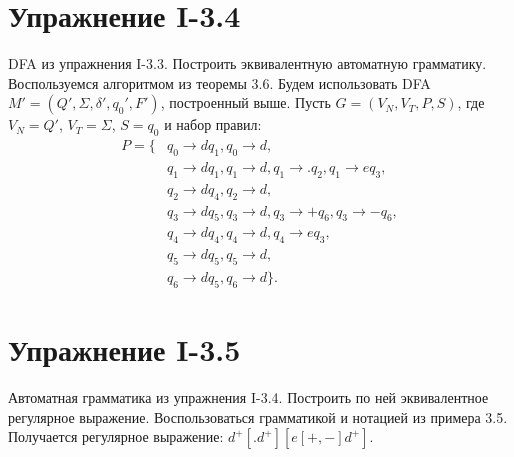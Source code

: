 \documentclass[12pt, oneside]{memoir}
\begin{document}
\section*{Упражнение I-3.4}
\begin{solution}
    {DFA из упражнения I-3.3.}
    {Построить эквивалентную автоматную грамматику.}
    {Воспользуемся алгоритмом из теоремы 3.6.}
    Будем использовать DFA $M' = (Q', \Sigma, \delta', q_0', F')$, построенный выше.
    Пусть $G = (V_N, V_T, P, S)$, где $V_N = Q'$, $V_T = \Sigma$, $S = q_0$ и набор правил:
    \begin{align*}
        P = \{ & q_0 \to d q_1, q_0 \to d,                               \\
               & q_1 \to d q_1, q_1 \to d, q_1 \to . q_2, q_1 \to e q_3, \\
               & q_2 \to d q_4, q_2 \to d,                               \\
               & q_3 \to d q_5, q_3 \to d, q_3 \to + q_6, q_3 \to - q_6, \\
               & q_4 \to d q_4, q_4 \to d, q_4 \to e q_3,                \\
               & q_5 \to d q_5, q_5 \to d,                               \\
               & q_6 \to d q_5, q_6 \to d\}.
    \end{align*}
\end{solution}

\section*{Упражнение I-3.5}
\begin{solution}
    {Автоматная грамматика из упражнения I-3.4.}
    {Построить по ней эквивалентное регулярное выражение.}
    {Воспользоваться грамматикой и нотацией из примера 3.5.}
    Получается регулярное выражение: $d^+[.d^+][e[+,-]d^+]$.
\end{solution}


\end{document}
